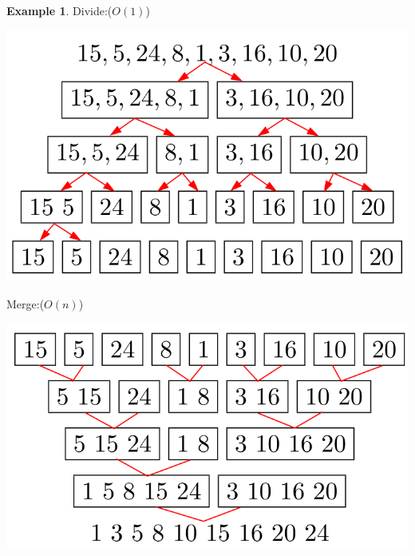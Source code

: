 \documentclass[10pt, a4paper]{extarticle}
\theoremstyle{definition}
\newtheorem{eg}{Example}
\begin{document}
\begin{eg}
	Divide:($O(1)$)
	\begin{center}
		\includegraphics[scale=0.3]{merge-sort1.png}\\
	\end{center}
	Merge:($O(n)$)
	\begin{center}
		\includegraphics[scale=0.3]{merge-sort2.png}\\
	\end{center}
\end{eg}
\end{document}
